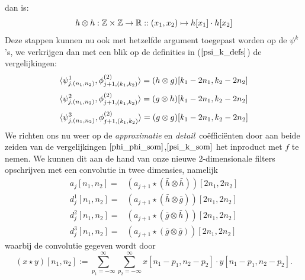 dan is:
\[
h\otimes h : \mathbb{Z}\times\mathbb{Z} \to \mathbb{R} :: (x_1,x_2) \mapsto h[x_1]\cdot h[x_2]
\]
Deze stappen kunnen nu ook met hetzelfde argument toegepast worden op de $\psi^k$'s,
we verkrijgen dan met een blik op de definities in ($\ref{psi_k_defs}$) de vergelijkingen:
\[
\langle \psi^1_{j,(n_1,n_2)} , \phi^{(2)}_{j+1,(k_1,k_2)} \rangle = (h\otimes g) [k_1-2n_1,k_2-2n_2]
\]
\[
\langle \psi^2_{j,(n_1,n_2)} , \phi^{(2)}_{j+1,(k_1,k_2)} \rangle = (g\otimes h) [k_1-2n_1,k_2-2n_2]
\]
\[
\langle \psi^3_{j,(n_1,n_2)} , \phi^{(2)}_{j+1,(k_1,k_2)} \rangle = (g\otimes g) [k_1-2n_1,k_2-2n_2]
\]
We richten ons nu weer op de \emph{approximatie} en \emph{detail}~co\"effici\"enten door
aan beide zeiden van de vergelijkingen $\ref{phi_phi_som}$,$\ref{psi_k_som}$ het inproduct
met $f$ te nemen. We kunnen dit aan de hand van onze nieuwe 2-dimensionale filters
opschrijven met een convolutie in twee dimensies, namelijk
\begin{eqnarray}
  \label{2d_coef_rec}
  a_{j}[n_1,n_2] =& (a_{j+1} \star (\bar{h} \otimes \bar{h}))[2n_1,2n_2] \\
  d^1_{j}[n_1,n_2] =&( a_{j+1} \star (\bar{h} \otimes \bar{g}))[2n_1,2n_2] \\
  d^2_{j}[n_1,n_2] =& (a_{j+1} \star (\bar{g} \otimes \bar{h}))[2n_1,2n_2] \\
  \label{2d_coef_rec_last}
  d^3_{j}[n_1,n_2] =& (a_{j+1} \star (\bar{g} \otimes \bar{g}))[2n_1,2n_2]
\end{eqnarray}
waarbij de convolutie gegeven wordt door
\[
(x \star y)[n_1,n_2] := \sum_{p_1=-\infty}^\infty \sum_{p_2 = -\infty}^\infty
x[n_1 - p_1,n_2 - p_2] \cdot y[n_1-p_1, n_2 - p_2].
\]



